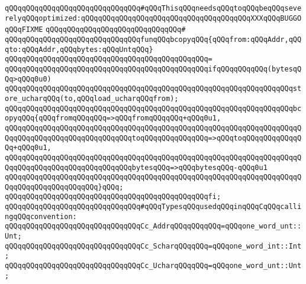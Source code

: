 \newline
\verb|qQQqqQQqqQQqqQQqqQQqqQQqqQQqqQQq#qQQqThisqQQqneedsqQQqtoqQQqbeqQQqseverelyqQQqoptimized:qQQqqQQqqQQqqQQqqQQqqQQqqQQqqQQqqQQqqQQqXXXqQQqBUGGOqQQqFIXME|\newline
\verb|qQQqqQQqqQQqqQQqqQQqqQQqqQQqqQQq#|\newline
\verb|qQQqqQQqqQQqqQQqqQQqqQQqqQQqqQQqfunqQQqbcopyqQQq{qQQqfrom:qQQqAddr,qQQqto:qQQqAddr,qQQqbytes:qQQqUntqQQq}|\newline
\verb|qQQqqQQqqQQqqQQqqQQqqQQqqQQqqQQqqQQqqQQqqQQqqQQq=|\newline
\verb|qQQqqQQqqQQqqQQqqQQqqQQqqQQqqQQqqQQqqQQqqQQqqQQqifqQQqqQQqqQQq(bytesqQQq>qQQq0u0)|\newline
\newline
\verb|qQQqqQQqqQQqqQQqqQQqqQQqqQQqqQQqqQQqqQQqqQQqqQQqqQQqqQQqqQQqqQQqqQQqstore_ucharqQQq(to,qQQqload_ucharqQQqfrom);|\newline
\newline
\verb|qQQqqQQqqQQqqQQqqQQqqQQqqQQqqQQqqQQqqQQqqQQqqQQqqQQqqQQqqQQqqQQqqQQqbcopyqQQq{qQQqfromqQQqqQQq=>qQQqfromqQQqqQQq+qQQq0u1,|\newline
\verb|qQQqqQQqqQQqqQQqqQQqqQQqqQQqqQQqqQQqqQQqqQQqqQQqqQQqqQQqqQQqqQQqqQQqqQQqqQQqqQQqqQQqqQQqqQQqqQQqqQQqtoqQQqqQQqqQQqqQQq=>qQQqtoqQQqqQQqqQQqqQQq+qQQq0u1,|\newline
\verb|qQQqqQQqqQQqqQQqqQQqqQQqqQQqqQQqqQQqqQQqqQQqqQQqqQQqqQQqqQQqqQQqqQQqqQQqqQQqqQQqqQQqqQQqqQQqqQQqqQQqbytesqQQq=>qQQqbytesqQQq-qQQq0u1|\newline
\verb|qQQqqQQqqQQqqQQqqQQqqQQqqQQqqQQqqQQqqQQqqQQqqQQqqQQqqQQqqQQqqQQqqQQqqQQqqQQqqQQqqQQqqQQqqQQq}qQQq;|\newline
\verb|qQQqqQQqqQQqqQQqqQQqqQQqqQQqqQQqqQQqqQQqqQQqqQQqfi;|\newline
\newline
\newline
\newline
\verb|qQQqqQQqqQQqqQQqqQQqqQQqqQQqqQQq#qQQqTypesqQQqusedqQQqinqQQqCqQQqcallingqQQqconvention:|\newline
\newline
\verb|qQQqqQQqqQQqqQQqqQQqqQQqqQQqqQQqCc_AddrqQQqqQQqqQQq=qQQqone_word_unt::Unt;|\newline
\newline
\verb|qQQqqQQqqQQqqQQqqQQqqQQqqQQqqQQqCc_ScharqQQqqQQq=qQQqone_word_int::Int;|\newline
\verb|qQQqqQQqqQQqqQQqqQQqqQQqqQQqqQQqCc_UcharqQQqqQQq=qQQqone_word_unt::Unt;|\newline
